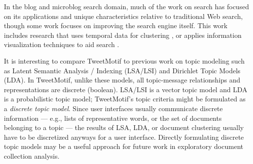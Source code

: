 \documentclass[letterpaper]{article}
\newcommand{\bto}[1]{\textcolor{blue}{\textbf{[#1 --BTO]}}}
\begin{document}
In the blog and microblog search domain, much of the work on search has focused on its applications and unique characteristics relative to traditional Web search, though some work focuses on improving the search engine  itself. This work includes research that uses temporal data for clustering \cite{alonso_clustering_2009}, or applies information visualization techniques to aid search \cite{ferreira-twitviz}.

It is interesting to compare TweetMotif to previous work on topic modeling such as Latent Semantic Analysis / Indexing (LSA/LSI) and Dirichlet Topic Models (LDA).  In TweetMotif, unlike these
models, all topic-message relationships and representations are discrete (boolean).  LSA/LSI is a vector topic model and LDA is a probabilistic topic model; TweetMotif's topic criteria might be formulated as a \emph{discrete topic model}.  Since user interfaces usually communicate discrete information --- e.g., lists of representative words, or the set of documents belonging to a topic --- the results of LSA, LDA, or document clustering usually have to be discretized anyways for a user interface.  Directly formulating discrete topic models may be a useful approach for future work in exploratory document collection analysis.  %







\end{document}
